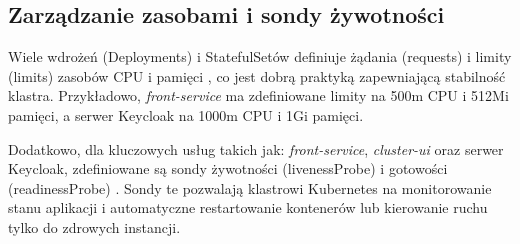 \subsection{Zarządzanie zasobami i sondy żywotności}
\label{sub:zasoby_sondy}
Wiele wdrożeń (Deployments) i StatefulSetów definiuje żądania (requests) i limity (limits) zasobów CPU i pamięci \cite{kubernetes_resources_docs}, co jest dobrą praktyką zapewniającą stabilność klastra. Przykładowo, \textit{front-service} ma zdefiniowane limity na 500m CPU i 512Mi pamięci, a serwer Keycloak na 1000m CPU i 1Gi pamięci.

Dodatkowo, dla kluczowych usług takich jak: \textit{front-service}, \textit{cluster-ui} oraz serwer Keycloak, zdefiniowane są sondy żywotności (livenessProbe) i gotowości (readinessProbe) \cite{kubernetes_probes_docs}. Sondy te pozwalają klastrowi Kubernetes na monitorowanie stanu aplikacji i automatyczne restartowanie kontenerów lub kierowanie ruchu tylko do zdrowych instancji.
